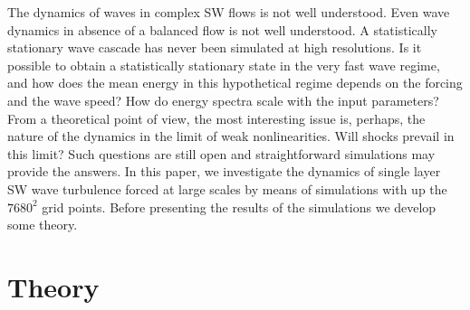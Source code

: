 \documentclass{jfm}
\begin{document}
The dynamics of waves in complex SW flows is not well
understood.  Even wave dynamics in absence of a balanced flow is not well
understood. A statistically stationary wave cascade has never been
simulated at high resolutions.
%
Is it possible to obtain a statistically stationary state in the very
fast wave regime, and how does the mean energy in this hypothetical
regime depends on the forcing and the wave speed?
How do energy spectra scale with the input parameters? From a theoretical point
of view, the most interesting issue is, perhaps, the nature of the dynamics in
the limit of weak nonlinearities. Will shocks prevail in this limit?
%
Such questions are still open and straightforward simulations may
provide the answers.
In this paper, we investigate the dynamics of single layer SW wave turbulence
forced  at large scales by means of
simulations with up the  $7680^2$ grid points.
%
Before presenting the results of the simulations we develop some theory.
%


\section{Theory}
\end{document}
